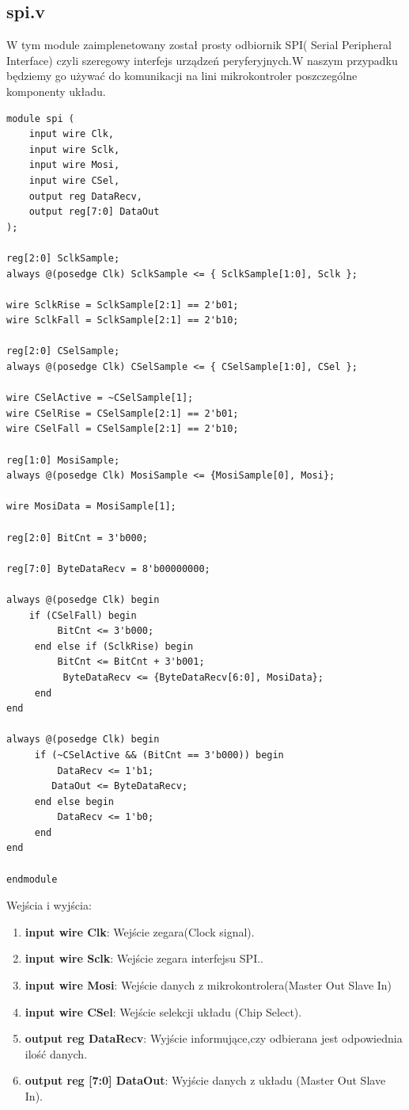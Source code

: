 \documentclass[12pt, a4paper]{article}
\begin{document}
\subsection{spi.v}
W tym module zaimplenetowany został prosty odbiornik SPI( Serial Peripheral Interface) czyli szeregowy interfejs urządzeń peryferyjnych.W naszym przypadku będziemy go używać do komunikacji na lini mikrokontroler poszczególne komponenty układu.

\begin{lstlisting}[style=prettyverilog,caption={Moduł spi.v}]
module spi (
    input wire Clk,
    input wire Sclk,
    input wire Mosi,
    input wire CSel,
    output reg DataRecv,
    output reg[7:0] DataOut
);

reg[2:0] SclkSample;
always @(posedge Clk) SclkSample <= { SclkSample[1:0], Sclk };

wire SclkRise = SclkSample[2:1] == 2'b01;
wire SclkFall = SclkSample[2:1] == 2'b10;

reg[2:0] CSelSample;
always @(posedge Clk) CSelSample <= { CSelSample[1:0], CSel };

wire CSelActive = ~CSelSample[1];
wire CSelRise = CSelSample[2:1] == 2'b01;
wire CSelFall = CSelSample[2:1] == 2'b10;

reg[1:0] MosiSample;
always @(posedge Clk) MosiSample <= {MosiSample[0], Mosi};

wire MosiData = MosiSample[1];

reg[2:0] BitCnt = 3'b000;

reg[7:0] ByteDataRecv = 8'b00000000;

always @(posedge Clk) begin
    if (CSelFall) begin
	     BitCnt <= 3'b000;
	 end else if (SclkRise) begin
	     BitCnt <= BitCnt + 3'b001;
		  ByteDataRecv <= {ByteDataRecv[6:0], MosiData};
	 end
end

always @(posedge Clk) begin
	 if (~CSelActive && (BitCnt == 3'b000)) begin
	     DataRecv <= 1'b1;
        DataOut <= ByteDataRecv;
	 end else begin
	     DataRecv <= 1'b0;
	 end
end

endmodule
\end{lstlisting}
Wejścia i wyjścia:
\begin{enumerate}
    \item \textbf{\fontsize{11}{10}\selectfont input wire Clk}: Wejście zegara(Clock signal).
    \item \textbf{\fontsize{11}{10}\selectfont input wire Sclk}: Wejście zegara interfejsu SPI..
    \item \textbf{\fontsize{11}{10}\selectfont input wire Mosi}: Wejście danych z mikrokontrolera(Master Out Slave In)
    \item \textbf{\fontsize{11}{10}\selectfont input wire CSel}: Wejście selekcji układu (Chip Select).
    \item \textbf{\fontsize{11}{10}\selectfont output reg DataRecv}: Wyjście informujące,czy odbierana jest odpowiednia ilość danych.
    \item \textbf{\fontsize{11}{10}\selectfont output reg [7:0] DataOut}: Wyjście danych z układu (Master Out Slave In).\newline{}
\end{enumerate}
\end{document}
